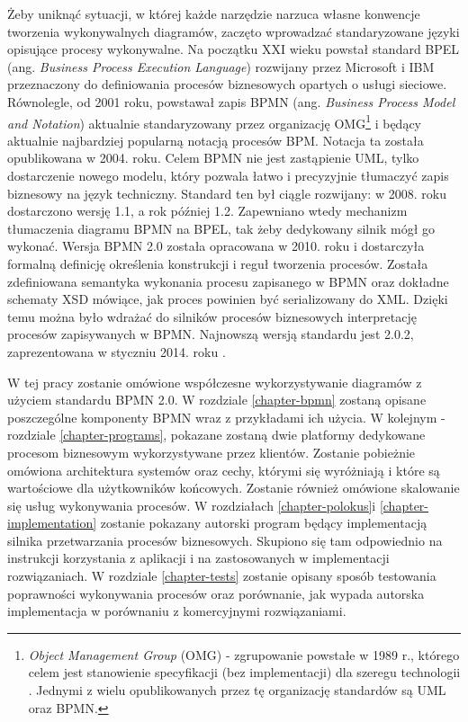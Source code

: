 \documentclass[declaration,shortabstract,mgr]{iithesis}
\newcommand{\bpmn}{BPMN }
\newcommand{\bpmnnospace}{BPMN}
\begin{document}
Żeby uniknąć sytuacji, w której każde narzędzie narzuca własne konwencje tworzenia wykonywalnych diagramów, zaczęto wprowadzać standaryzowane języki opisujące procesy wykonywalne. Na początku XXI wieku powstał standard BPEL (ang. \textit{Business Process Execution Language}) rozwijany przez Microsoft i IBM przeznaczony do definiowania procesów biznesowych opartych o usługi sieciowe. Równolegle, od 2001 roku, powstawał zapis \bpmn (ang. \textit{Business Process Model and Notation}) aktualnie standaryzowany przez organizację OMG\footnote{\textit{Object Management Group} (OMG) - zgrupowanie powstałe w 1989 r., którego celem jest stanowienie specyfikacji (bez implementacji) dla szeregu technologii \cite{omg-wiki}. Jednymi z wielu opublikowanych przez tę organizację standardów są UML oraz BPMN.} i będący aktualnie najbardziej popularną notacją procesów BPM. Notacja ta została opublikowana w 2004. roku. Celem \bpmn nie jest zastąpienie UML, tylko dostarczenie nowego modelu, który pozwala łatwo i precyzyjnie tłumaczyć zapis biznesowy na język techniczny. Standard ten był ciągle rozwijany: w 2008. roku dostarczono wersję 1.1, a rok później 1.2. Zapewniano wtedy mechanizm tłumaczenia diagramu \bpmn na BPEL, tak żeby dedykowany silnik mógł go wykonać. Wersja \bpmn 2.0 została opracowana w 2010. roku i dostarczyła formalną definicję określenia konstrukcji i reguł tworzenia procesów. Została zdefiniowana semantyka wykonania procesu zapisanego w \bpmn oraz dokładne schematy XSD mówiące, jak proces powinien być serializowany do XML. Dzięki temu można było wdrażać do silników procesów biznesowych interpretację procesów zapisywanych w \bpmnnospace. Najnowszą wersją standardu jest 2.0.2, zaprezentowana w styczniu 2014. roku \cite{bpmn-new-20}.


W tej pracy zostanie omówione współczesne wykorzystywanie diagramów z użyciem standardu \bpmn 2.0. W rozdziale \ref{chapter-bpmn} zostaną opisane poszczególne komponenty \bpmn wraz z przykładami ich użycia. W kolejnym - rozdziale \ref{chapter-programs}, pokazane zostaną dwie platformy dedykowane procesom biznesowym wykorzystywane przez klientów. Zostanie pobieżnie omówiona architektura systemów oraz cechy, którymi się wyróżniają i które są wartościowe dla użytkowników końcowych. Zostanie również omówione skalowanie się usług wykonywania procesów. W rozdziałach \ref{chapter-polokus}i \ref{chapter-implementation} zostanie pokazany autorski program będący implementacją silnika przetwarzania procesów biznesowych. Skupiono się tam odpowiednio na instrukcji korzystania z aplikacji i na zastosowanych w implementacji rozwiązaniach. W rozdziale \ref{chapter-tests} zostanie opisany sposób testowania poprawności wykonywania procesów oraz porównanie, jak wypada autorska implementacja w porównaniu z komercyjnymi rozwiązaniami.
\end{document}
